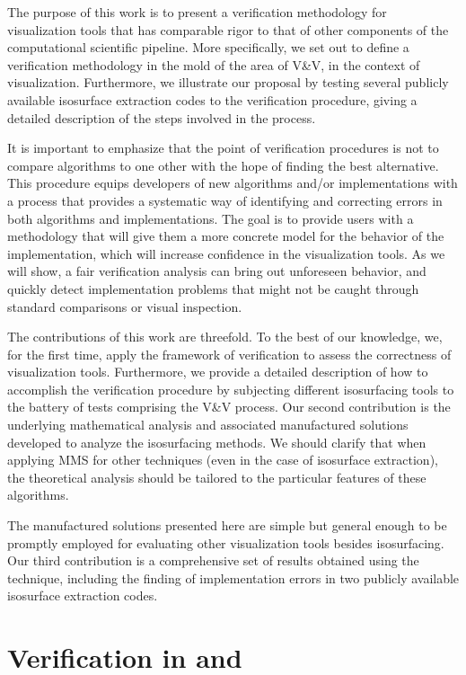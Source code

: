 The purpose of this work is to present a verification methodology
for visualization tools that has comparable rigor to that of other 
components of the computational scientific pipeline. More specifically, we set out
to define a verification methodology in the mold of the area of V\&V, 
in the context of visualization.
Furthermore, we illustrate our proposal by testing several publicly 
available isosurface extraction
codes to the verification procedure, giving a detailed 
description of the steps involved in the process.

It is important to emphasize that the point of verification procedures
is not to compare algorithms to one other with
the hope of finding the best alternative.
This procedure equips developers of new algorithms and/or 
implementations with a process that provides a systematic way 
of identifying and correcting errors in both algorithms and implementations.
The goal is to provide users with a methodology that will give them a
more concrete model for the behavior of the implementation, which will
increase confidence in the visualization tools. 
As we will show, a fair verification analysis can 
bring out unforeseen behavior, and quickly detect implementation problems that
might not be caught through standard comparisons or visual inspection.

The contributions of this work are threefold. To the best of our
knowledge, we, for the first time, apply the framework of 
verification to assess the correctness of visualization tools.
Furthermore, we provide a detailed description of how to accomplish the 
verification procedure by subjecting different isosurfacing tools 
to the battery of tests comprising the V\&V process. 
Our second contribution is the underlying mathematical analysis and associated 
manufactured solutions developed to analyze the isosurfacing methods.
We should clarify that when applying MMS for other techniques (even in
the case of isosurface extraction), the theoretical analysis should be
tailored to the particular features of these algorithms.

The manufactured solutions presented here are simple but
general enough to be promptly employed for evaluating other 
visualization tools besides isosurfacing.
Our third contribution is a comprehensive set of results obtained
using the technique, including the finding of implementation errors in
two publicly available isosurface extraction codes.

\section{Verification in \cs{} and \cse{}}

